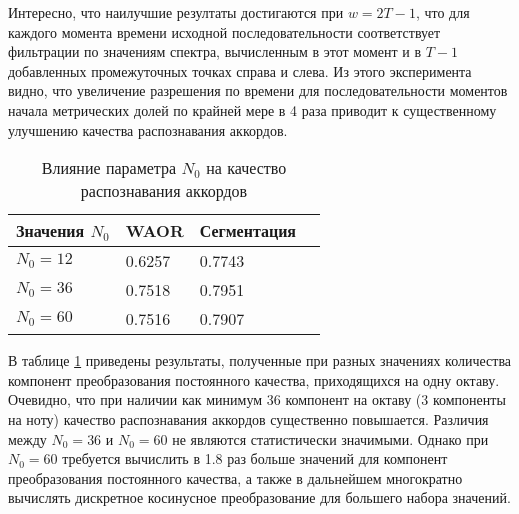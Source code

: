 Интересно, что наилучшие резултаты достигаются при $w = 2T-1$, что для каждого
момента времени исходной последовательности соответствует фильтрации по
значениям спектра, вычисленным в этот момент и в $T-1$ добавленных промежуточных
точках справа и слева. Из этого эксперимента видно, что увеличение разрешения по
времени для последовательности моментов начала метрических долей по крайней мере
в 4 раза приводит к существенному улучшению качества распознавания аккордов.

\begin{table} [htbp]
  \centering
  \parbox{15cm}{\caption{Влияние параметра $N_0$ на качество распознавания
  аккордов} \label{TN0}}
  \begin{tabular}{|l|l|l|l|}
  \hline
  Значения $N_0$ & WAOR & Сегментация \\
  \hline
  $N_0 = 12$ & 0.6257 & 0.7743 \\
  $N_0 = 36$ & 0.7518 & 0.7951 \\
  $N_0 = 60$ & 0.7516 & 0.7907 \\
  \hline
  \end{tabular}
\end{table}

В таблице \ref{TN0} приведены результаты, полученные при разных значениях
количества компонент преобразования постоянного качества, приходящихся на одну
октаву. Очевидно, что при наличии как минимум 36 компонент на октаву (3
компоненты на ноту) качество распознавания аккордов существенно повышается.
Различия между $N_0=36$ и $N_0=60$ не являются статистически значимыми. Однако
при $N_0=60$ требуется вычислить в 1.8 раз больше значений для компонент
преобразования постоянного качества, а также в дальнейшем многократно вычислять
дискретное косинусное преобразование для большего набора значений.

